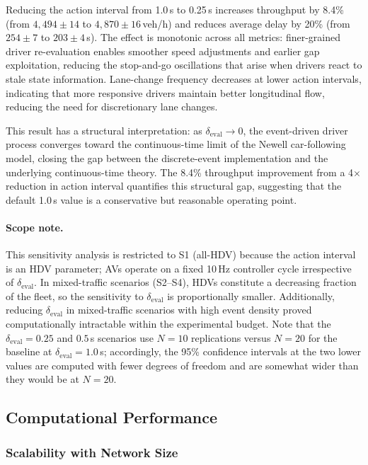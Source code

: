 \documentclass[review,authoryear]{elsarticle}
\begin{document}
Reducing the action interval from 1.0\,s to 0.25\,s increases throughput by 8.4\% (from $4{,}494 \pm 14$ to $4{,}870 \pm 16$\,veh/h) and reduces average delay by 20\% (from $254 \pm 7$ to $203 \pm 4$\,s). The effect is monotonic across all metrics: finer-grained driver re-evaluation enables smoother speed adjustments and earlier gap exploitation, reducing the stop-and-go oscillations that arise when drivers react to stale state information. Lane-change frequency decreases at lower action intervals, indicating that more responsive drivers maintain better longitudinal flow, reducing the need for discretionary lane changes.

This result has a structural interpretation: as $\delta_{\text{eval}} \to 0$, the event-driven driver process converges toward the continuous-time limit of the Newell car-following model, closing the gap between the discrete-event implementation and the underlying continuous-time theory. The 8.4\% throughput improvement from a 4$\times$ reduction in action interval quantifies this structural gap, suggesting that the default 1.0\,s value is a conservative but reasonable operating point.

\paragraph{Scope note.} This sensitivity analysis is restricted to S1 (all-HDV) because the action interval is an HDV parameter; AVs operate on a fixed 10\,Hz controller cycle irrespective of $\delta_{\text{eval}}$. In mixed-traffic scenarios (S2--S4), HDVs constitute a decreasing fraction of the fleet, so the sensitivity to $\delta_{\text{eval}}$ is proportionally smaller. Additionally, reducing $\delta_{\text{eval}}$ in mixed-traffic scenarios with high event density proved computationally intractable within the experimental budget. Note that the $\delta_{\text{eval}} = 0.25$ and $0.5$\,s scenarios use $N = 10$ replications versus $N = 20$ for the baseline at $\delta_{\text{eval}} = 1.0$\,s; accordingly, the 95\% confidence intervals at the two lower values are computed with fewer degrees of freedom and are somewhat wider than they would be at $N = 20$.


\subsection{Computational Performance}
\label{sec:exp_performance_new}

\subsubsection{Scalability with Network Size}
\label{sec:exp_scalability}
\end{document}
